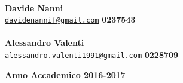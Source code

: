 \documentclass[12pt,a4paper]{report}
\begin{document}
\begin{titlepage}
\begin{minipage}[t]{0.78\textwidth}
{ \large{ \\ \bf Davide Nanni} \\ \href{mailto:davidenannif@gmail.com}{\texttt{davidenannif@gmail.com}} \hfill \large{ \bf 0237543 }\\
 \large{ \\ \bf Alessandro Valenti} \\ \href{mailto:alessandro.valenti1991@gmail.com}{\texttt{alessandro.valenti1991@gmail.com}} \hfill \large{ \bf 0228709 }\\
}
\end{minipage}
\vspace{30mm}
\par
\begin{center}
{\large{\bf Anno Accademico 2016-2017 }}
\end{center}
\end{titlepage}
\end{document}
